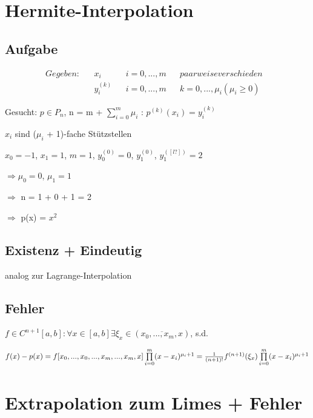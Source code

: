 \documentclass[12pt,a4paper]{article} %
\begin{document}
	\section{Hermite-Interpolation}
	
	\subsection{Aufgabe}
	
	\begin{align*}
		Gegeben: && x_i && i = 0, ..., m && paarweise verschieden & \\
		&& y_i^{(k)} && i = 0, ..., m && k = 0, ..., \mu_i (\mu_i \ge 0)
	\end{align*}
	
	Gesucht: $p \in P_n$, n = m + $\sum\limits_{i = 0}^{m}\mu_i$ : $p^{(k)}(x_i) = y_i^{(k)}$
	
	$x_i$ sind ($\mu_i$ + 1)-fache Stützstellen
	
	$x_0 = -1$, $x_1 = 1$, $m = 1$, $y_0^{(0)} = 0$, $y_1^{(0)}$, $y_1^{([l?])} = 2$
	
	$\Rightarrow \mu_0 = 0$, $\mu_1 = 1$
	
	$\Rightarrow$ n = 1 + 0 + 1 = 2
	
	$\Rightarrow$ p(x) = $x^2$
	
	\subsection{Existenz + Eindeutig}
	
	analog zur Lagrange-Interpolation
	
	\subsection{Fehler}
	
	$f \in C^{n + 1}[a, b]: \forall x \in [a, b] \exists \xi_x \in (\overline{x_0, ..., x_m, x})$, s.d.
	
	$f(x) - p(x) = f[x_0, ..., x_0, ..., x_m, ..., x_m, x]\prod\limits_{i = 0}^{m}(x - x_i)^{\mu_i + 1} \\
	 = \frac{1}{(n + 1)!}f^{(n + 1)}(\xi_x)\prod\limits_{i = 0}^{m}(x - x_i)^{\mu_i + 1}$
	
	\newpage
	
	\section[Extrapolation]{Extrapolation zum Limes + Fehler}
	
\end{document}
